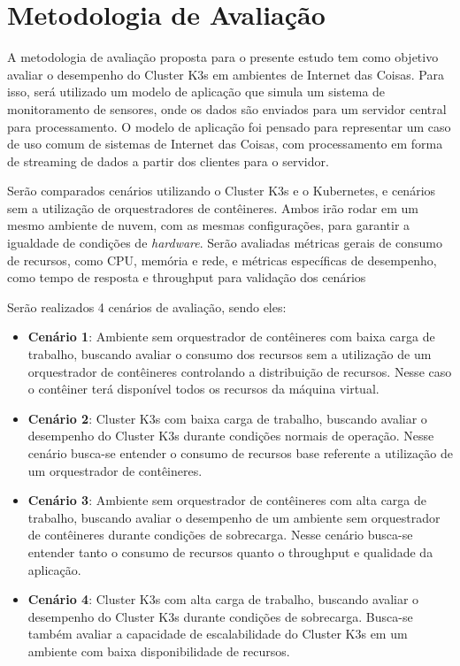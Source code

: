 \section{Metodologia de Avaliação}
\label{Metodologia}

A metodologia de avaliação proposta para o presente estudo tem como objetivo avaliar o desempenho do Cluster K3s em ambientes de Internet das Coisas.
Para isso, será utilizado um modelo de aplicação que simula um sistema de monitoramento de sensores, onde os dados são enviados para um servidor central para processamento.
O modelo de aplicação foi pensado para representar um caso de uso comum de sistemas de Internet das Coisas, com processamento em forma de streaming de dados a partir dos clientes para o servidor.

Serão comparados cenários utilizando o Cluster K3s e o Kubernetes, e cenários sem a utilização de orquestradores de contêineres.
Ambos irão rodar em um mesmo ambiente de nuvem, com as mesmas configurações, para garantir a igualdade de condições de \textit{hardware}.
Serão avaliadas métricas gerais de consumo de recursos, como CPU, memória e rede, e métricas específicas de desempenho, como tempo de resposta e throughput para validação dos cenários

Serão realizados 4 cenários de avaliação, sendo eles:
\begin{itemize}
    \item \textbf{Cenário 1}: Ambiente sem orquestrador de contêineres com baixa carga de trabalho, buscando avaliar o consumo dos recursos sem a utilização de um orquestrador de contêineres controlando a distribuição de recursos.
    Nesse caso o contêiner terá disponível todos os recursos da máquina virtual.

    \item \textbf{Cenário 2}: Cluster K3s com baixa carga de trabalho, buscando avaliar o desempenho do Cluster K3s durante condições normais de operação.
    Nesse cenário busca-se entender o consumo de recursos base referente a utilização de um orquestrador de contêineres. 

    \item \textbf{Cenário 3}: Ambiente sem orquestrador de contêineres com alta carga de trabalho, buscando avaliar o desempenho de um ambiente sem orquestrador de contêineres durante condições de sobrecarga.
    Nesse cenário busca-se entender tanto o consumo de recursos quanto o throughput e qualidade da aplicação. 

    \item \textbf{Cenário 4}: Cluster K3s com alta carga de trabalho, buscando avaliar o desempenho do Cluster K3s durante condições de sobrecarga. 
    Busca-se também avaliar a capacidade de escalabilidade do Cluster K3s em um ambiente com baixa disponibilidade de recursos.

\end{itemize}

